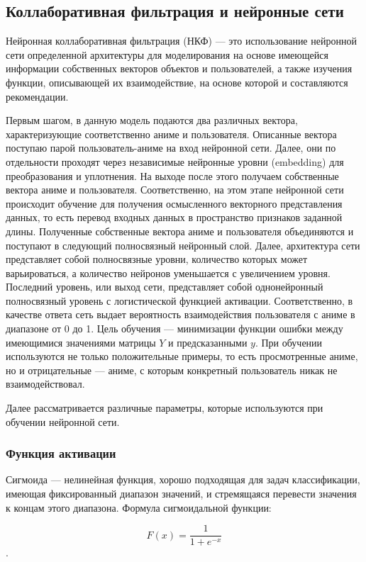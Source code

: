 \documentclass[bachelor, och, diploma]{SCWorks}
\begin{document}
\subsection{Коллаборативная фильтрация и нейронные сети}
Нейронная коллаборативная фильтрация (НКФ) --- это использование нейронной сети определенной архитектуры для моделирования на основе имеющейся информации собственных векторов объектов и пользователей, а также изучения функции, описывающей их взаимодействие, на основе которой и составляются рекомендации.

Первым шагом, в данную модель подаются два различных вектора, 
характеризующие соответственно аниме и пользователя. Описанные вектора поступаю парой пользователь-аниме
 на вход нейронной сети. Далее, они по отдельности проходят через независимые нейронные уровни (embedding) для преобразования и уплотнения.
  На выходе после этого получаем собственные вектора аниме и пользователя. Соответственно, на этом этапе нейронной сети происходит обучение для
   получения осмысленного векторного представления данных, то есть перевод входных данных в пространство признаков заданной длины. Полученные 
   собственные вектора аниме и пользователя объединяются и поступают в следующий полносвязный нейронный слой. Далее, архитектура сети представляет
    собой полносвязные уровни, количество которых может варьироваться, а количество нейронов уменьшается с увеличением уровня. Последний уровень, или выход сети,
	 представляет собой однонейронный полносвязный уровень с логистической функцией активации. Соответственно, в качестве ответа сеть выдает вероятность взаимодействия пользователя с аниме
	  в диапазоне от 0 до 1. Цель обучения --- минимизации функции ошибки между имеющимися значениями матрицы $Y$ и предсказанными $y$. При обучении используются 
	  не только положительные примеры, то есть просмотренные аниме, но и отрицательные --- аниме, с которым конкретный пользователь никак не взаимодействовал.

Далее рассматривается различные параметры, которые используются при обучении нейронной сети. 

\subsubsection{Функция активации}
Сигмоида — нелинейная функция, хорошо подходящая для задач классификации, имеющая фиксированный диапазон значений, и стремящаяся перевести значения к концам этого диапазона. Формула сигмоидальной функции: 

$$F(x) = \frac{1}{1 + e^{-x}}$$.
\end{document}

